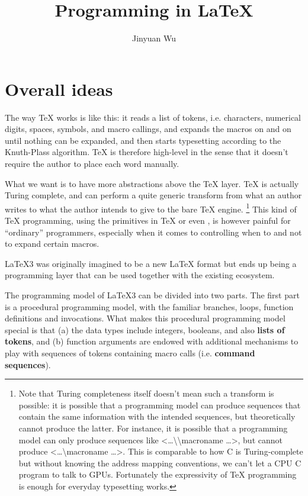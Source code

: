 \documentclass[hyperref, a4paper, 12pt]{article}
\title{Programming in LaTeX}
\author{Jinyuan Wu}
\newcommand*{\concept}[1]{{\textbf{#1}}}
\def\texttt#1{<#1>}%
\newcommand{\shortcode}[1]{\texttt{#1}}
\begin{document}
\maketitle

\section{Overall ideas}

The way \TeX{} works is like this:
it reads a list of tokens, i.e. characters, numerical digits, spaces, symbols, and macro callings,
and expands the macros on and on until nothing can be expanded,
and then starts typesetting according to the Knuth-Plass algorithm.
\TeX{} is therefore high-level in the sense that it doesn't require the author
to place each word manually.

What we want is to have more abstractions above the \TeX{} layer.
\TeX{} is actually Turing complete, and can perform a quite generic transform from
what an author writes to what the author intends to give to the bare \TeX{} engine.%
\footnote{
    Note that Turing completeness itself doesn't mean such a transform is possible:
    it is possible that a programming model can produce sequences that contain the same information
    with the intended sequences,
    but theoretically cannot produce the latter.
    For instance, it is possible that a programming model can only produce sequences like 
    \shortcode{\dots \textbackslash \textbackslash macroname \dots},
    but cannot produce \shortcode{\dots \textbackslash macroname \dots}.
    This is comparable to how C is Turing-complete but without knowing the address mapping conventions,
    we can't let a CPU C program to talk to GPUs.
    Fortunately the expressivity of \TeX{} programming is enough for everyday typesetting works.
}
This kind of \TeX{} programming, using the primitives in \TeX{} or even \LaTeXe,
is however painful for ``ordinary'' programmers,
especially when it comes to controlling when to and not to expand certain macros.

\LaTeX 3 was originally imagined to be a new \LaTeX{} format but ends up being a programming layer
that can be used together with the existing \LaTeXe{} ecosystem.

The programming model of \LaTeX 3 can be divided into two parts.
The first part is a procedural programming model,
with the familiar branches, loops, function definitions and invocations.
What makes this procedural programming model special 
is that (a) the data types include integers, booleans, and also \concept{lists of tokens},
and (b) function arguments are endowed with additional mechanisms to 
play with sequences of tokens containing macro calls (i.e. \concept{command sequences}).
\end{document}
